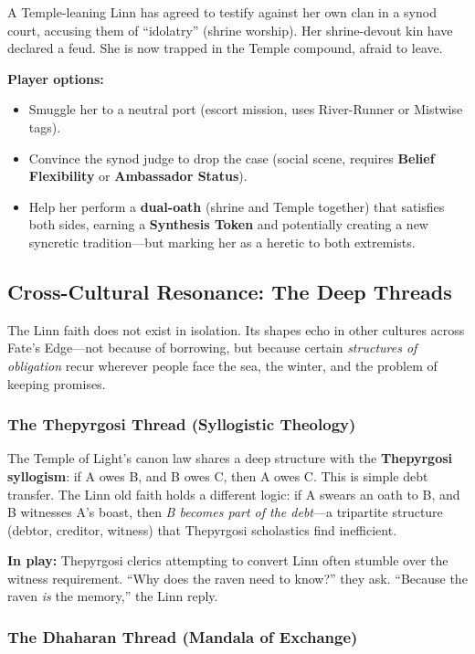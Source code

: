 \documentclass[11pt]{article}
\begin{document}
A Temple-leaning Linn has agreed to testify against her own clan in a synod court, accusing them of ``idolatry'' (shrine worship). Her shrine-devout kin have declared a feud. She is now trapped in the Temple compound, afraid to leave.

\textbf{Player options:}
\begin{itemize}
\item Smuggle her to a neutral port (escort mission, uses River-Runner or Mistwise tags).
\item Convince the synod judge to drop the case (social scene, requires \textbf{Belief Flexibility} or \textbf{Ambassador Status}).
\item Help her perform a \textbf{dual-oath} (shrine and Temple together) that satisfies both sides, earning a \textbf{Synthesis Token} and potentially creating a new syncretic tradition---but marking her as a heretic to both extremists.
\end{itemize}

\subsection{Cross-Cultural Resonance: The Deep Threads}

The Linn faith does not exist in isolation. Its shapes echo in other cultures across Fate's Edge---not because of borrowing, but because certain \textit{structures of obligation} recur wherever people face the sea, the winter, and the problem of keeping promises.

\subsubsection{The Thepyrgosi Thread (Syllogistic Theology)}

The Temple of Light's canon law shares a deep structure with the \textbf{Thepyrgosi syllogism}: if A owes B, and B owes C, then A owes C. This is simple debt transfer. The Linn old faith holds a different logic: if A swears an oath to B, and B witnesses A's boast, then \textit{B becomes part of the debt}---a tripartite structure (debtor, creditor, witness) that Thepyrgosi scholastics find inefficient.

\textbf{In play:} Thepyrgosi clerics attempting to convert Linn often stumble over the witness requirement. ``Why does the raven need to know?'' they ask. ``Because the raven \textit{is} the memory,'' the Linn reply.

\subsubsection{The Dhaharan Thread (Mandala of Exchange)}
\end{document}
